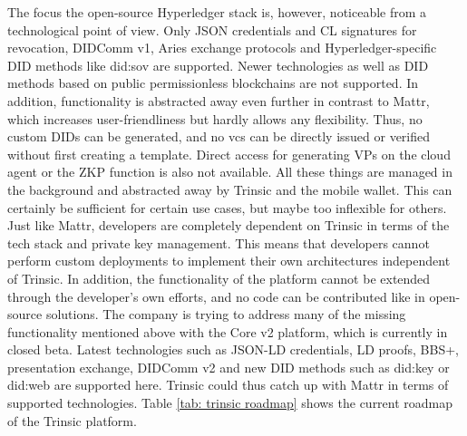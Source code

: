             The focus the open-source Hyperledger stack is, however, noticeable from a technological point of view. Only JSON credentials and \ac{CL} signatures for revocation, DIDComm v1, Aries exchange protocols and Hyperledger-specific \ac{DID} methods like did:sov are supported. Newer technologies as well as \ac{DID} methods based on public permissionless blockchains are not supported. In addition, functionality is abstracted away even further in contrast to Mattr, which increases user-friendliness but hardly allows any flexibility. Thus, no custom \acp{DID} can be generated, and no \acp{vc} can be directly issued or verified without first creating a template. Direct access for generating \acp{VP} on the cloud agent or the \ac{ZKP} function is also not available. All these things are managed in the background and abstracted away by Trinsic and the mobile wallet. This can certainly be sufficient for certain use cases, but maybe too inflexible for others. Just like Mattr, developers are completely dependent on Trinsic in terms of the tech stack and private key management. This means that developers cannot perform custom deployments to implement their own architectures independent of Trinsic. In addition, the functionality of the platform cannot be extended through the developer's own efforts, and no code can be contributed like in open-source solutions. The company is trying to address many of the missing functionality mentioned above with the Core v2 platform, which is currently in closed beta. Latest technologies such as JSON-LD credentials, LD proofs, BBS+, presentation exchange, DIDComm v2 and new \ac{DID} methods such as did:key or did:web are supported here. Trinsic could thus catch up with Mattr in terms of supported technologies. Table \ref{tab: trinsic roadmap} shows the current roadmap of the Trinsic platform. 
            \newline
    
